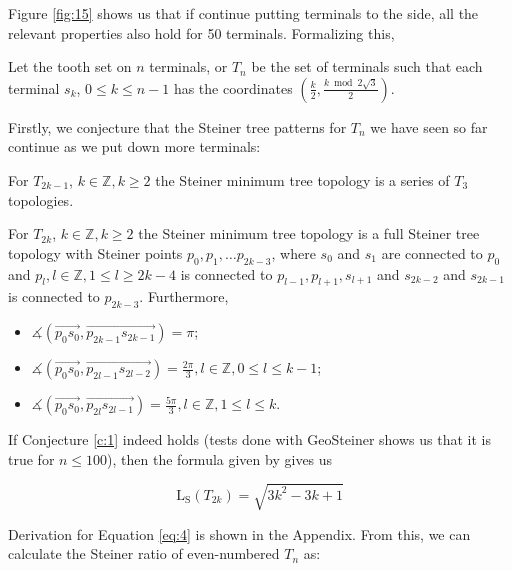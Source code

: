 \documentclass{mpaper}
\begin{document}

Figure \ref{fig:15} shows us that if continue putting terminals to the side, all the relevant properties also hold for 50 terminals. Formalizing this,

\begin{definition}
  Let the tooth set on $n$ terminals, or $T_n$ be the set of terminals such that each terminal $s_k$, $0\leq k \leq n-1$ has the coordinates $\left(\frac{k}{2}, \frac{k \bmod 2\sqrt{3}}{2}\right)$.
\end{definition}

Firstly, we conjecture that the Steiner tree patterns for $T_n$ we have seen so far continue as we put down more terminals:

\begin{conjecture}\label{c:1}
  For $T_{2k-1}$, $k\in\mathbb{Z}, k\geq 2$ the Steiner minimum tree topology is a series of $T_3$ topologies.

  For $T_{2k}$, $k\in\mathbb{Z}, k\geq 2$ the Steiner minimum tree topology is a full Steiner tree topology with Steiner points $p_0,\allowbreak p_1,\allowbreak \dots p_{2k-3}$, where $s_0$ and $s_1$ are connected to $p_0$ and $p_l, l\in\mathbb{Z}, 1\leq l\geq 2k-4$ is connected to $p_{l-1}, p_{l+1}, s_{l+1}$ and  $s_{2k-2}$ and $s_{2k-1}$ is connected to  $p_{2k-3}$. Furthermore,

    \begin{itemize}
    \item $\measuredangle(\overrightarrow{p_0s_0}, \overrightarrow{p_{2k-1}s_{2k-1}})=\pi$;
    \item $\measuredangle(\overrightarrow{p_0s_0}, \overrightarrow{p_{2l-1}s_{2l-2}})=\frac{2\pi}{3}, l\in\mathbb{Z}, 0\leq l\leq k-1$;
    \item $\measuredangle(\overrightarrow{p_0s_0}, \overrightarrow{p_{2l}s_{2l-1}})=\frac{5\pi}{3}, l\in\mathbb{Z}, 1\leq l\leq k$.
  \end{itemize}
\end{conjecture}

If Conjecture \ref{c:1} indeed holds (tests done with GeoSteiner shows us that it is true for $n\leq 100$), then the formula given by \cite{uteshev2021length} gives us

\begin{equation} \label{eq:4}
  \operatorname{L_S}(T_{2k}) = \sqrt{3k^2 -3k + 1}
\end{equation}

Derivation for Equation \ref{eq:4} is shown in the Appendix. From this, we can calculate the Steiner ratio of even-numbered $T_n$ as:
\end{document}

